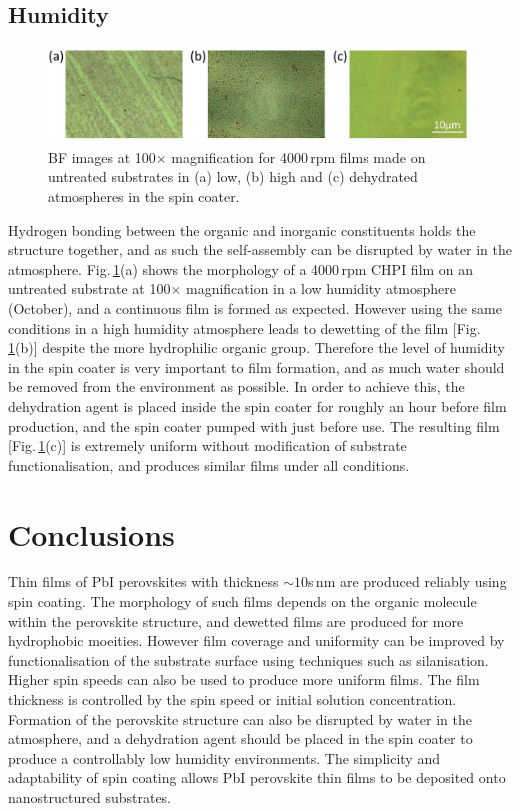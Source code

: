 \subsection{Humidity}
\begin{figure}[] 
\centering    
\includegraphics[width=\textwidth]{Fig8}
\caption{BF images at 100$\times$ magnification for 4000\,rpm films made on untreated substrates in (a) low, (b) high and (c) dehydrated atmospheres in the spin coater.}
\label{4Fig8}
\end{figure}
Hydrogen bonding between the organic and inorganic constituents holds the structure together, and as such the self-assembly can be disrupted by water in the atmosphere. Fig.\,\ref{4Fig8}(a) shows the morphology of a 4000\,rpm CHPI film on an untreated substrate at 100$\times$ magnification in a low humidity atmosphere (October), and a continuous film is formed as expected. However using the same conditions in a high humidity atmosphere leads to dewetting of the film [Fig.\,\ref{4Fig8}(b)] despite the more hydrophilic organic group. Therefore the level of humidity in the spin coater is very important to film formation, and as much water should be removed from the environment as possible. In order to achieve this, the dehydration agent  is placed inside the spin coater for roughly an hour before film production, and the spin coater pumped with  just before use. The resulting film [Fig.\,\ref{4Fig8}(c)] is extremely uniform without modification of substrate functionalisation, and produces similar films under all conditions.

\section{Conclusions}
Thin films of PbI perovskites with thickness $\sim10$s\,nm are produced reliably using spin coating. The morphology of such films depends on the organic molecule within the perovskite structure, and dewetted films are produced for more hydrophobic moeities. However film coverage and uniformity can be improved by functionalisation of the substrate surface using techniques such as silanisation. Higher spin speeds can also be used to produce more uniform films. The film thickness is controlled by the spin speed or initial solution concentration. Formation of the perovskite structure can also be disrupted by water in the atmosphere, and a dehydration agent should be placed in the spin coater to produce a controllably low humidity environments. The simplicity and adaptability of spin coating allows PbI perovskite thin films to be deposited onto nanostructured substrates.